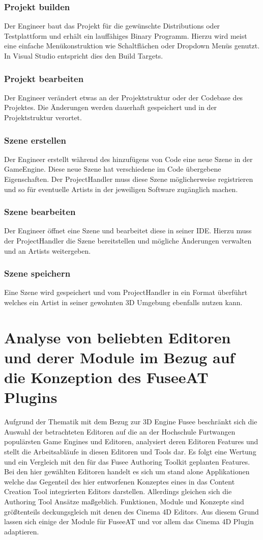 \documentclass[pagesize, paper=a4, fontsize=12pt, titlepage=true, headings=small, headnosepline, abstractoff, liststotoc, nochapterprefix, plainheadsepline, twoside]{scrreprt}
\begin{document}
\subsubsection{Projekt builden}
Der Engineer baut das Projekt für die gewünschte Distributions oder Testplattform und erhält ein lauffähiges Binary Programm. Hierzu wird meist eine einfache Menükonstruktion wie Schaltflächen oder Dropdown Menüs genutzt. In Visual Studio entspricht dies den Build Targets.

\subsubsection{Projekt bearbeiten}
Der Engineer verändert etwas an der Projektstruktur oder der Codebase des Projektes. Die Änderungen werden dauerhaft gespeichert und in der Projektstruktur verortet.

\subsubsection{Szene erstellen}
Der Engineer erstellt während des hinzufügens von Code eine neue Szene in der GameEngine. Diese neue Szene hat verschiedene im Code übergebene Eigenschaften. Der ProjectHandler muss diese Szene möglicherweise registrieren und so für eventuelle Artists in der jeweiligen Software zugänglich machen.

\subsubsection{Szene bearbeiten}
Der Engineer öffnet eine Szene und bearbeitet diese in seiner IDE. Hierzu muss der ProjectHandler die Szene bereitstellen und mögliche Änderungen verwalten und an Artists weitergeben.

\subsubsection{Szene speichern}
Eine Szene wird gespeichert und vom ProjectHandler in ein Format überführt welches ein Artist in seiner gewohnten 3D Umgebung ebenfalls nutzen kann.

\section{Analyse von beliebten Editoren und derer Module im Bezug auf die Konzeption des FuseeAT Plugins}
Aufgrund der Thematik mit dem Bezug zur 3D Engine Fusee beschränkt sich die Auswahl der betrachteten Editoren auf die an der Hochschule Furtwangen populärsten Game Engines und Editoren, analysiert deren Editoren Features und stellt die Arbeitsabläufe in diesen Editoren und Tools dar. Es folgt eine Wertung und ein Vergleich mit den für das Fusee Authoring Toolkit geplanten Features. Bei den hier gewählten Editoren handelt es sich um stand alone Applikationen welche das Gegenteil des hier entworfenen Konzeptes eines in das Content Creation Tool integrierten Editors darstellen. Allerdings gleichen sich die Authoring Tool Ansätze maßgeblich. Funktionen, Module und Konzepte sind größtenteils deckungsgleich mit denen des Cinema 4D Editors. Aus diesem Grund lassen sich einige der Module für FuseeAT und vor allem das Cinema 4D Plugin adaptieren.
\end{document}
